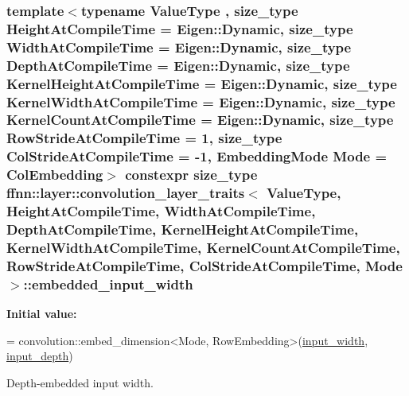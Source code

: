 \hypertarget{structffnn_1_1layer_1_1convolution__layer__traits_ae43600771fd374186af19f38dd2805bf}{
\subsubsection[{embedded\-\_\-input\-\_\-width}]{\setlength{\rightskip}{0pt plus 5cm}template$<$typename Value\-Type , size\-\_\-type Height\-At\-Compile\-Time = Eigen\-::\-Dynamic, size\-\_\-type Width\-At\-Compile\-Time = Eigen\-::\-Dynamic, size\-\_\-type Depth\-At\-Compile\-Time = Eigen\-::\-Dynamic, size\-\_\-type Kernel\-Height\-At\-Compile\-Time = Eigen\-::\-Dynamic, size\-\_\-type Kernel\-Width\-At\-Compile\-Time = Eigen\-::\-Dynamic, size\-\_\-type Kernel\-Count\-At\-Compile\-Time = Eigen\-::\-Dynamic, size\-\_\-type Row\-Stride\-At\-Compile\-Time = 1, size\-\_\-type Col\-Stride\-At\-Compile\-Time = -\/1, Embedding\-Mode Mode = Col\-Embedding$>$ constexpr {\bf size\-\_\-type} {\bf ffnn\-::layer\-::convolution\-\_\-layer\-\_\-traits}$<$ Value\-Type, Height\-At\-Compile\-Time, Width\-At\-Compile\-Time, Depth\-At\-Compile\-Time, Kernel\-Height\-At\-Compile\-Time, Kernel\-Width\-At\-Compile\-Time, Kernel\-Count\-At\-Compile\-Time, Row\-Stride\-At\-Compile\-Time, Col\-Stride\-At\-Compile\-Time, Mode $>$\-::embedded\-\_\-input\-\_\-width\hspace{0.3cm}{\ttfamily [static]}}}\label{structffnn_1_1layer_1_1convolution__layer__traits_ae43600771fd374186af19f38dd2805bf}
{\bfseries Initial value\-:}
\begin{DoxyCode}
=
    convolution::embed\_dimension<Mode, RowEmbedding>(\hyperlink{structffnn_1_1layer_1_1convolution__layer__traits_aeb9e3903c86bc692b6cee14434537e46}{input\_width},  
      \hyperlink{structffnn_1_1layer_1_1convolution__layer__traits_a508a1594a6f77f6f536744cd40e2b9fd}{input\_depth})
\end{DoxyCode}


Depth-\/embedded input width. 

